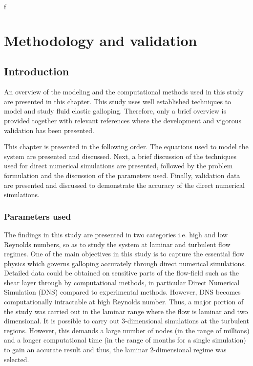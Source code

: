 ƒ\textbf{}
\chapter{Methodology and validation}

\section{Introduction}
 
An overview of the modeling and the computational methods used in this study are presented in this chapter. This study uses well established techniques to model and study fluid elastic galloping. Therefore, only a brief overview is provided together with relevant references where the development and vigorous validation has been presented.  

This chapter is presented in the following order. The equations used to model the system are presented and discussed. Next, a brief discussion of the techniques used for direct numerical simulations are presented, followed by the problem formulation and the discussion of the parameters used. Finally, validation data are presented and discussed to demonstrate the accuracy of the direct numerical simulations.


\subsection{Parameters used}

The findings in this study are presented in two categories i.e. high and low Reynolds numbers, so as to study the system at laminar and turbulent flow regimes. One of the main objectives in this study is to capture the essential flow physics which governs galloping accurately through direct numerical simulations. Detailed data could be obtained on sensitive parts of the flow-field such as the shear layer through by computational methods, in particular Direct Numerical Simulation (DNS) compared to experimental methods. However, DNS becomes computationally intractable at high Reynolds number. Thus, a major portion of the study was carried out in the laminar range where the flow is laminar and two dimensional. It is possible to carry out 3-dimensional simulations at the turbulent regions. However, this demands a large number of nodes (in the range of millions) and a longer computational time (in the range of months for a single simulation) to gain an accurate result and thus, the laminar 2-dimensional regime was selected.

